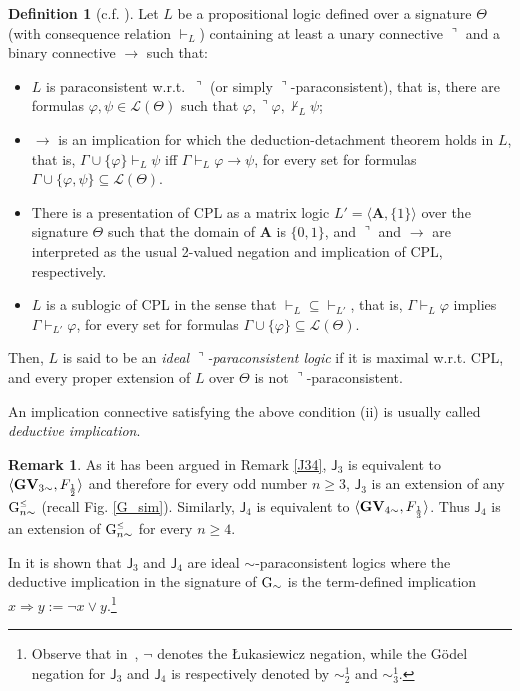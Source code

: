 \documentclass{article}
\theoremstyle{definition}
\newtheorem{definition}{Definition}
\newtheorem{remark}{Remark}
\newcommand{\Gnsimleq}{\mathrm{G}\mystrut^{\text{\tiny $\leq$}}_{n\sim}}
\newcommand\mystrut{\rule{0pt}{7pt}}
\begin{document}
\begin{definition} [c.f. \cite{ArieliAZ11a}] \label{IdPar}
Let $L$ be a propositional logic defined over a signature $\Theta$ (with consequence relation $\vdash_L$) containing at least a unary connective $\urcorner$ and a binary connective $\to$ such that:
\begin{itemize}
\item[(i)] $L$ is paraconsistent w.r.t.\ $\urcorner$ (or simply $\urcorner$-paraconsistent), that is,  there are formulas $\varphi,\psi \in \mathcal{L}(\Theta)$ such that $ \varphi, \urcorner\varphi, \nvdash_L\psi$;
\item[(ii)] $\to$ is an implication for which the deduction-detachment theorem holds in $L$, that is, $\Gamma \cup \{\varphi\} \vdash_L \psi$ iff  $\Gamma \vdash_L \varphi \to\psi$, for every set for formulas $\Gamma \cup \{\varphi, \psi\} \subseteq  \mathcal{L}(\Theta)$.
%
\item[(iii)] There is a presentation of CPL as a matrix logic  $L' = \langle \mathbf{A}, \{1\}\rangle$  over the signature $\Theta$ such that the domain of $\mathbf{A}$ is $ \{0,1\}$, and $\urcorner$ and $\to$ are interpreted as the usual 2-valued negation and implication of CPL, respectively.

\item[(iv)] $L$ is a sublogic of CPL in the sense that ${\vdash_L} \subseteq {\vdash_{L'}}$, that is, $\Gamma \vdash_L \varphi$ implies  $\Gamma \vdash_{L'} \varphi$,  for every set for formulas $\Gamma \cup \{\varphi\} \subseteq  \mathcal{L}(\Theta)$.
\end{itemize}
Then, $L$ is said to be an {\em ideal $\urcorner$-paraconsistent logic} if it is maximal w.r.t. CPL, and every proper extension of $L$ over $\Theta$ is not $\urcorner$-paraconsistent.


\end{definition}

An implication connective satisfying the above condition (ii) is usually called {\em deductive implication}.

\begin{remark}\label{3i4IdealParac}
As it has been argued in Remark \ref{J34},
$\mathsf{J}_3$ is equivalent to $\langle {\bf GV}_{3\sim}, F_{\frac{1}{2}}\rangle$ and therefore for every odd number $n\geq3$, $\mathsf{J}_3$ is an extension of any $\Gnsimleq$ (recall Fig. \ref{G_sim}).
Similarly,  $\mathsf{J}_4$ is equivalent to $\langle {\bf GV}_{4\sim}, F_{\frac{1}{3}}\rangle$. Thus $\mathsf{J}_4$ is an extension of $\Gnsimleq$  for every $n\geq 4$.


In \cite[Proposition 6.3]{CoEsGiGo} it is shown that $\mathsf{J}_3$ and $\mathsf{J}_4$ are ideal $\sim$-paraconsistent logics where the deductive implication in the signature of $\rm{G}_{\sim}$
is the term-defined implication $x\Rightarrow y:=  \neg x \lor y$.\footnote{Observe that in~\cite{CoEsGiGo}, $\neg$ denotes the \L ukasiewicz negation, while the G\"odel negation for $\mathsf{J}_3$ and $\mathsf{J}_4$  is respectively denoted by $\sim^1_2$ and $\sim^1_3$.}
\end{remark}
\end{document}
